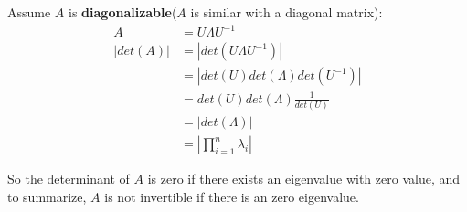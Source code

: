 


Assume $A$ is \textbf{diagonalizable}($A$ is similar with a diagonal matrix):
\begin{align*}
A &= U\Lambda U^{-1}\\
|det(A)| &= |det(U\Lambda U^{-1})| \\
&= |det(U)det(\Lambda)det(U^{-1})|\\
&= det(U)det(\Lambda)\frac{1}{det(U)}\\
&= |det(\Lambda)|\\
&= |\prod^n_{i=1}\lambda_i|
\end{align*}

So the determinant of $A$ is zero if there exists an eigenvalue with zero value, and to summarize, $A$ is not invertible if there is an zero eigenvalue. 

